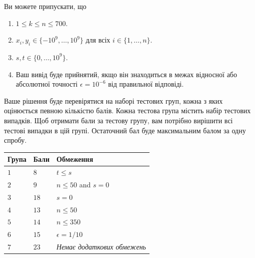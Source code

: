 Ви можете припускати, що
\begin{enumerate}
\item $1\leq k\leq n\leq 700$. %
\item $x_i, y_i\in \{-10^9,\ldots, 10^9\}$ для всіх $i\in\{1,\ldots,n\}$. %
\item $s,t\in \{0,\ldots, 10^9\}$. %
\item Ваш вивід буде прийнятий, якщо він знаходиться в межах відносної або абсолютної точності $\epsilon = 10^{-6}$ від правильної відповіді.
\end{enumerate}


Ваше рішення буде перевірятися на наборі тестових груп, кожна з яких оцінюється певною кількістю балів.
Кожна тестова група містить набір тестових випадків.
Щоб отримати бали за тестову групу, вам потрібно вирішити всі тестові випадки в цій групі.
Остаточний бал буде максимальним балом за одну спробу.

\medskip
\noindent
\begin{tabular}{lll}
  Група & Бали & Обмеження\\\hline
  $1$ & $8$ &  $t\leq s$\\
  $2$ & $9$ & $n\le 50$ and $s=0$\\
  $3$ & $18$ & $s=0$\\
  $4$ & $13$ & $n\leq 50$\\
  $5$ & $14$ & $n\leq 350$\\
  $6$ & $15$ & $\epsilon = 1/10$\\
  $7$ & $23$ & \emph{Немає додаткових обмежень}\\
\end{tabular}




